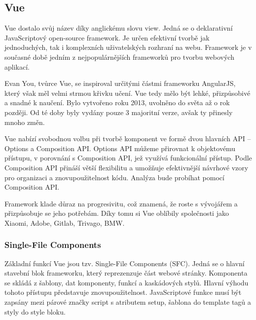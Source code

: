 \subsection{Vue}


Vue dostalo svůj název díky anglickému slovu view. Jedná se o deklarativní JavaScriptový open-source framework. 
Je určen efektivní tvorbě jak jednoduchých, tak i komplexních uživatelských rozhraní na webu. 
Framework je v současné době jedním z nejpopulárnějších frameworků pro tvorbu webových aplikací.\cite{vuemacrae,vue}

Evan You, tvůrce Vue, se inspiroval určitými částmi frameworku AngularJS, který však měl velmi strmou křivku učení. 
Vue tedy mělo být lehké, přizpůsobivé a snadné k naučení. Bylo vytvořeno roku 2013, uvolněno do světa až o rok později. 
Od té doby byly vydány pouze 3 majoritní verze, avšak ty přinesly mnoho změn.\cite{vueflexiple,vuemedium}

Vue nabízí svobodnou volbu při tvorbě komponent ve formě dvou hlavních API -- Options a Composition API. 
Options API můžeme přirovnat k objektovému přístupu, v porovnání s Composition API, jež využívá funkcionální přístup. 
Podle \cite{vue} Composition API přináší větší flexibilitu a umožňuje efektivnější návrhové vzory pro organizaci a znovupoužitelnost kódu. 
Analýza bude probíhat pomocí Composition API.

Framework klade důraz na progresivitu, což znamená, že roste s vývojářem a přizpůsobuje se jeho potřebám. 
Díky tomu si Vue oblíbily společnosti jako Xiaomi, Adobe, Gitlab, Trivago, BMW.\cite{vuetriodev,vue}

\subsubsection{Single-File Components}

Základní funkcí Vue jsou tzv. Single-File Components (SFC). Jedná se o hlavní stavební blok frameworku, který reprezenzuje část webové stránky. 
Komponenta se skládá z šablony, dat komponenty, funkcí a kaskádových stylů. Hlavní výhodu tohoto přístupu představuje znovupoužitelnost. 
JavaScriptové funkce musí být zapsány mezi párové značky script s atributem setup, šablona do template tagů a styly do style bloku.\cite{vuemacrae,vue}

